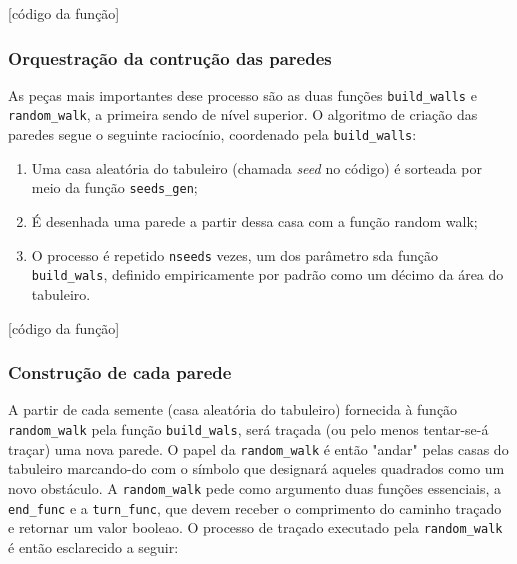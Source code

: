 \documentclass{article}
\begin{document}
[código da função]

\subsubsection{Orquestração da contrução das paredes}

As peças mais importantes dese processo são as duas funções \verb|build_walls| e \verb|random_walk|, a primeira sendo de nível superior. O algoritmo de criação das paredes segue o seguinte raciocínio, coordenado pela \verb|build_walls|:

\begin{enumerate}
	\item Uma casa aleatória do tabuleiro (chamada \emph{seed} no código) é sorteada por meio da função \verb|seeds_gen|;
	\item É desenhada uma parede a partir dessa casa com a função random walk;
	\item O processo é repetido \verb|nseeds| vezes, um dos parâmetro sda função \verb|build_wals|, definido empiricamente por padrão como um décimo da área do tabuleiro.
\end{enumerate}

[código da função]


\subsubsection{Construção de cada parede}

A partir de cada semente (casa aleatória do tabuleiro) fornecida à função \verb|random_walk| pela função \verb|build_wals|, será traçada (ou pelo menos tentar-se-á traçar) uma nova parede. O papel da \verb|random_walk| é então "andar" pelas casas do tabuleiro marcando-do com o símbolo que designará aqueles quadrados como um novo obstáculo. A \verb|random_walk| pede como argumento duas funções essenciais, a \verb|end_func| e a \verb|turn_func|, que devem receber o comprimento do caminho traçado e retornar um valor booleao. O processo de traçado executado pela \verb|random_walk| é então esclarecido a seguir:
\end{document}
